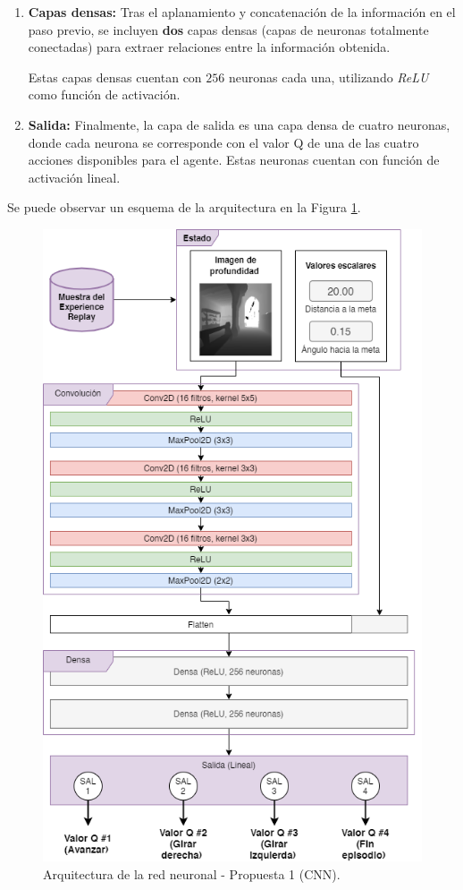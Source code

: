 \begin{enumerate}
	\item \textbf{Capas densas:} Tras el aplanamiento y concatenación de la información en el paso previo, se incluyen \textbf{dos} capas densas (capas de neuronas totalmente conectadas) para extraer relaciones entre la información obtenida.
	
	Estas capas densas cuentan con $256$ neuronas cada una, utilizando \textit{ReLU} como función de activación.
	
	\item \textbf{Salida:} Finalmente, la capa de salida es una capa densa de cuatro neuronas, donde cada neurona se corresponde con el valor Q de una de las cuatro acciones disponibles para el agente. Estas neuronas cuentan con función de activación lineal.
\end{enumerate}

Se puede observar un esquema de la arquitectura en la Figura \ref{fig:chap5-arc1}.

\begin{figure}
    \centering
    \includegraphics[height=0.95\textheight]{imagenes/cap5/arquitectura1.png}
    \caption{Arquitectura de la red neuronal - Propuesta 1 (CNN).}
    \label{fig:chap5-arc1}
\end{figure}	

